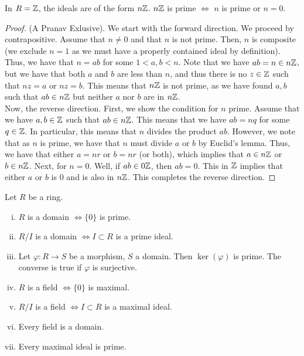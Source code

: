 \begin{ex}
    In $R = \mathbb{Z}$, the ideals are of the form $n\mathbb{Z}$. $n\mathbb{Z}$ is prime $\iff$ $n$ is prime or $n = 0$.
\end{ex}
\begin{proof}
    (A Pranav Exlusive). We start with the forward direction. We proceed by contrapositive.
    Assume that $n \neq 0$ and that $n$ is not prime. Then, $n$ is composite (we exclude $n = 1$ as
    we must have a properly contained ideal by definition). Thus, we have that $n = ab$ for some $1 < a,b < n$.
    Note that we have $ab = n \in n\mathbb{Z}$, but we have that both $a$ and $b$ are less than $n$, and thus there is no $z \in \mathbb{Z}$
    such that $nz = a$ or $nz = b$. This means that $n\mathbb{Z}$ is not prime, as we have found $a,b$ such that
    $ab \in n\mathbb{Z}$ but neither $a$ nor $b$ are in $n\mathbb{Z}$. \\
    Now, the reverse direction. First, we show the condition for $n$ prime. Assume that we have $a,b \in \mathbb{Z}$ such that $ab \in n\mathbb{Z}$.
    This means that we have $ab = nq$ for some $q \in \mathbb{Z}$. In particular, this means that $n$ divides
    the product $ab$. However, we note that as $n$ is prime, we have that $n$ must divide $a$
    or $b$ by Euclid's lemma. Thus, we have that either $a = nr$ or $b = nr$ (or both), which implies
    that $a \in n\mathbb{Z}$ or $b \in n\mathbb{Z}$. Next, for $n = 0$. Well, if $ab \in 0\mathbb{Z}$, then $ab = 0$. This in $\mathbb{Z}$ implies
    that either $a$ or $b$  is $0$ and is also in $n\mathbb{Z}$. This completes the reverse direction.
\end{proof}
\begin{thm}\label{thm:ideals}
    Let $R$ be a ring.
    \begin{enumerate}[i)]
        \item $R$ is a domain $\iff \{0\}$ is prime.
        \item $R / I$ is a domain $\iff I \subset R$ is a prime ideal.
        \item Let $\varphi: R \rightarrow S$ be a morphism, $S$ a domain. Then
        $\ker(\varphi)$ is prime. The converse is true if $\varphi$ is surjective.
        \item $R$ is a field $\iff \{0\}$ is maximal.
        \item $R / I$ is a field $\iff I \subset R$ is a maximal ideal.
        \item Every field is a domain.
        \item Every maximal ideal is prime.
    \end{enumerate}
\end{thm}
